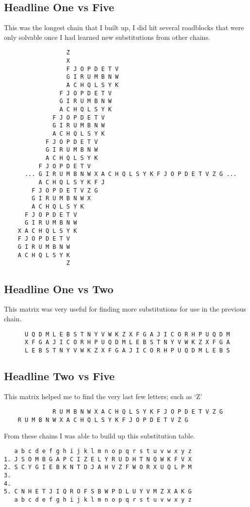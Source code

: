 \documentclass[11pt,a4paper,twoside]{article}
\begin{document}
\pagebreak
\subsection{Headline One vs Five}
This was the longest chain that I built up, I did hit several roadblocks that
were only solvable once I had learned new substitutions from other chains. 

\begin{lstlisting}
                  Z
                  X
                  F J O P D E T V 
                  G I R U M B N W  
                  A C H Q L S Y K 
                F J O P D E T V 
                G I R U M B N W  
                A C H Q L S Y K 
              F J O P D E T V 
              G I R U M B N W
              A C H Q L S Y K
            F J O P D E T V 
            G I R U M B N W 
            A C H Q L S Y K 
          F J O P D E T V  
      ... G I R U M B N W X A C H Q L S Y K F J O P D E T V Z G ...
          A C H Q L S Y K F J
        F J O P D E T V Z G    
        G I R U M B N W X 
        A C H Q L S Y K
      F J O P D E T V 
      G I R U M B N W  
    X A C H Q L S Y K
    F J O P D E T V 
    G I R U M B N W  
    A C H Q L S Y K
                  Z
\end{lstlisting}

\subsection{Headline One vs Two}
This matrix was very useful for finding more substitutions for use in the
previous chain. 
\begin{lstlisting}
      U Q D M L E B S T N Y V W K Z X F G A J I C O R H P U Q D M
      X F G A J I C O R H P U Q D M L E B S T N Y V W K Z X F G A 
      L E B S T N Y V W K Z X F G A J I C O R H P U Q D M L E B S       
\end{lstlisting}

\subsection{Headline Two vs Five}
This matrix helped me to find the very last few letters; such as `Z'  
\begin{lstlisting}
              R U M B N W X A C H Q L S Y K F J O P D E T V Z G 
    R U M B N W X A C H Q L S Y K F J O P D E T V Z G
\end{lstlisting}


From these chains I was able to build up this substitution table.
\begin{lstlisting}
   a b c d e f g h i j k l m n o p q r s t u v w x y z
1. J S O M B G A P C I Z E L Y R U D H T N Q W K F V X 
2. S C Y G I E B K N T D J A H V Z F W O R X U Q L P M 
3.                                                     
4.                                                     
5. C N H E T J I Q R O F S B W P D L U Y V M Z X A K G 
   a b c d e f g h i j k l m n o p q r s t u v w x y z
\end{lstlisting}
\end{document}
